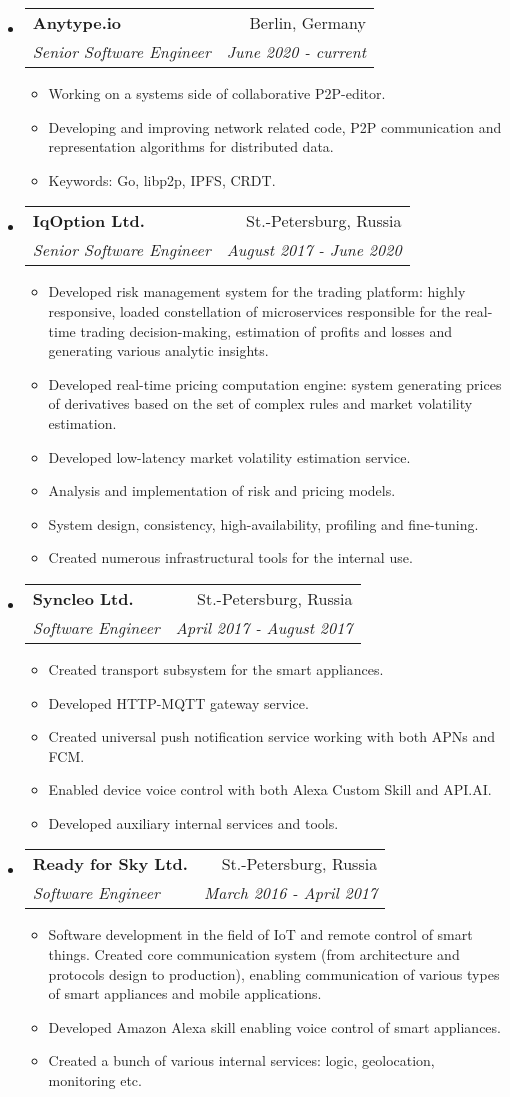 \documentclass[letterpaper,11pt]{article}
\makeatletter
\newcommand{\resitem}[1]{\item #1 \vspace{-2pt}}
\newcommand{\ressubheading}[4]{
\begin{tabular*}{6.5in}{l@{\cftdotfill{\cftsecdotsep}\extracolsep{\fill}}r}
		\textbf{#1} & #2 \\
		\textit{#3} & \textit{#4} \\
\end{tabular*}\vspace{-6pt}}
\makeatother
\begin{document}
\begin{itemize}

\item
	\ressubheading{Anytype.io}{Berlin, Germany}{Senior Software Engineer}{June 2020 - current}
	\begin{itemize}
		\resitem{Working on a systems side of collaborative P2P-editor.}
		\resitem{Developing and improving network related code, P2P communication and representation algorithms for distributed data.}
		\resitem{Keywords: Go, libp2p, IPFS, CRDT.}
	\end{itemize}

\item
	\ressubheading{IqOption Ltd.}{St.-Petersburg, Russia}{Senior Software Engineer}{August 2017 - June 2020}
	\begin{itemize}
		\resitem{Developed risk management system for the trading platform: highly responsive, loaded constellation of microservices responsible for the real-time trading decision-making, estimation of profits and losses and generating various analytic insights.}
		\resitem{Developed real-time pricing computation engine: system generating prices of derivatives based on the set of complex rules and market volatility estimation.}
		\resitem{Developed low-latency market volatility estimation service.}
		\resitem{Analysis and implementation of risk and pricing models.}
		\resitem{System design, consistency, high-availability, profiling and fine-tuning.}
		\resitem{Created numerous infrastructural tools for the internal use.}
	\end{itemize}

\item
	\ressubheading{Syncleo Ltd.}{St.-Petersburg, Russia}{Software Engineer}{April 2017 - August 2017}
	\begin{itemize}
		\resitem{Created transport subsystem for the smart appliances.}
		\resitem{Developed HTTP-MQTT gateway service.}
		\resitem{Created universal push notification service working with both APNs and FCM.}
		\resitem{Enabled device voice control with both Alexa Custom Skill and API.AI.}
		\resitem{Developed auxiliary internal services and tools.}
	\end{itemize}

\item 
	\ressubheading{Ready for Sky Ltd.}{St.-Petersburg, Russia}{Software Engineer}{March 2016 - April 2017}
	\begin{itemize}
		\resitem{Software development in the field of IoT and remote control of smart things. Created core communication system (from architecture and protocols design to production), enabling communication of various types of smart appliances and mobile applications.}
		\resitem{Developed Amazon Alexa skill enabling voice control of smart appliances.}
		\resitem{Created a bunch of various internal services: logic, geolocation, monitoring etc.}
	\end{itemize}


\end{itemize}
\end{document}
